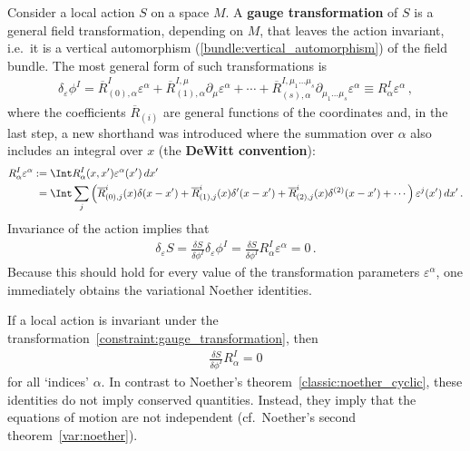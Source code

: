     Consider a local action $S$ on a space $M$. A \textbf{gauge transformation} of $S$ is a general field transformation, depending on $M$, that leaves the action invariant, i.e.~it is a vertical automorphism (\cref{bundle:vertical_automorphism}) of the field bundle. The most general form of such transformations is
    \begin{gather}
        \label{constraint:gauge_transformation}
        \delta_\varepsilon\phi^I = \overline{R}^I_{(0),\alpha}\varepsilon^\alpha + \overline{R}^{I,\mu}_{(1),\alpha}\partial_\mu\varepsilon^\alpha + \cdots + \overline{R}^{I,\mu_1\ldots\mu_s}_{(s),\alpha}\partial_{\mu_1\ldots\mu_s}\varepsilon^\alpha\equiv R^I_\alpha\varepsilon^\alpha\,,
    \end{gather}
    where the coefficients $\overline{R}_{(i)}$ are general functions of the coordinates and, in the last step, a new shorthand was introduced where the summation over $\alpha$ also includes an integral over $x$ (the \textbf{DeWitt convention}):
    \begin{align}
        R^I_\alpha\varepsilon^\alpha &:= \Int R^I_\alpha(x,x')\varepsilon^\alpha(x')\,dx'\\
        &\phantom{:}= \Int\sum_j\left(\overline{R}^i_{(0),j}(x)\delta(x-x')+\overline{R}^i_{(1),j}(x)\delta'(x-x')+\overline{R}^i_{(2),j}(x)\delta^{(2)}(x-x')+\cdots\right)\varepsilon^j(x')\,dx'\,.\nonumber
    \end{align}
    Invariance of the action implies that
    \begin{gather}
        \delta_\varepsilon S = \frac{\delta S}{\delta\phi^I}\delta_\varepsilon\phi^I = \frac{\delta S}{\delta\phi^I}R^I_\alpha\varepsilon^\alpha = 0\,.
    \end{gather}
    Because this should hold for every value of the transformation parameters $\varepsilon^\alpha$, one immediately obtains the variational Noether identities.
    \begin{property}\label{field:noether_identity}
        If a local action is invariant under the transformation~\eqref{constraint:gauge_transformation}, then
        \begin{gather}
            \frac{\delta S}{\delta\phi^I}R^I_\alpha = 0
        \end{gather}
        for all `indices' $\alpha$. In contrast to Noether's theorem~\ref{classic:noether_cyclic}, these identities do not imply conserved quantities. Instead, they imply that the equations of motion are not independent (cf.~Noether's second theorem~\ref{var:noether}).
    \end{property}

